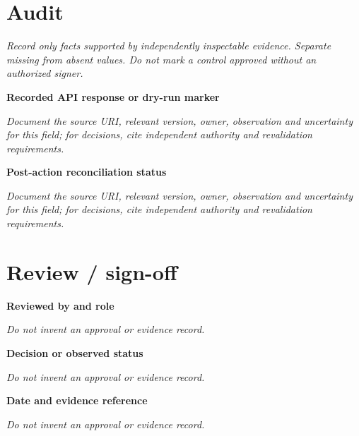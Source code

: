 \documentclass[11pt,letterpaper]{article}
\begin{document}
\section{Audit}
\noindent\emph{Record only facts supported by independently inspectable evidence. Separate missing from absent values. Do not mark a control approved without an authorized signer.}\par
\noindent\textbf{Recorded API response or dry-run marker}\par
\noindent\emph{Document the source URI, relevant version, owner, observation and uncertainty for this field; for decisions, cite independent authority and revalidation requirements.}\par\medskip
\noindent\textbf{Post-action reconciliation status}\par
\noindent\emph{Document the source URI, relevant version, owner, observation and uncertainty for this field; for decisions, cite independent authority and revalidation requirements.}\par\medskip
\section{Review / sign-off}
\noindent\textbf{Reviewed by and role}\par
\emph{Do not invent an approval or evidence record.}\par\medskip
\noindent\textbf{Decision or observed status}\par
\emph{Do not invent an approval or evidence record.}\par\medskip
\noindent\textbf{Date and evidence reference}\par
\emph{Do not invent an approval or evidence record.}\par\medskip
\end{document}

